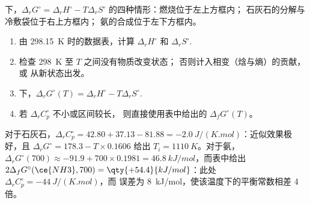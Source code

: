 \begin{omfigure}

{\small {}下，$\Delta_r G^\circ = \Delta_r H^\circ - T\Delta_r
S^\circ$ 的四种情形：燃烧位于左上方框内；
石灰石的分解与冷敷袋位于右上方框内；
氨的合成位于左下方框内。}
\end{omfigure}

\begin{method}[温度 $T$ 下的标准反应吉布斯自由能]\label{met:b2:reaction-free-energy:delta-g-standard}
\begin{enumerate}
  \item 由 \qty{298.15}{K} 时的数据表，计算 $\Delta_r H^\circ$ 和
        $\Delta_r S^\circ$.
  \item 检查 \qty{298}{K} 至 $T$ 之间没有物质改变状态；
        否则计入相变（焓与熵）的贡献，或
        从新状态出发。
  \item {}下，$\Delta_r G^\circ(T) = \Delta_r H^\circ
        - T\Delta_r S^\circ$.
  \item 若 $\Delta_r C^\circ_p$ 不小或区间较长，
        则直接使用表中给出的 $\Delta_f G^\circ(T)$。
\end{enumerate}
\end{method}

\begin{example}[近似的两项检验]\label{ex:b2:reaction-free-energy:tests}
对于石灰石，$\Delta_r C^\circ_p = 42.80 + 37.13 - 81.88 =
\qty{-2.0}{J/(K.mol)}$：近似效果极好，且 $\Delta_r
G^\circ = 178.3 - T \times 0.1606$ 给出 $T_i = \qty{1110}{K}$。对于氨，
$\Delta_r G^\circ(700) \approx -91.9 + 700 \times 0.1981 =
\qty{+46.8}{kJ/mol}$，而表中给出 $2\Delta_f G^\circ(\ce{NH3}, 700) =
\qty{+54.4}{kJ/mol}$：此处 $\Delta_r C^\circ_p = \qty{-44}{J/(K.mol)}$，而
误差为 \qty{8}{kJ/mol}，使该温度下的平衡常数相差
4 倍。
\end{example}

